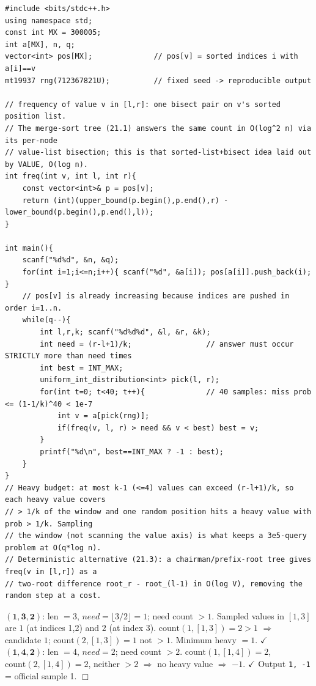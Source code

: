 \begin{lstlisting}[caption={CF 840D Summit: sample O(1) positions of the static window, count each candidate's frequency by a bisection on its sorted position list (the merge-sort-tree primitive of 21.1, transposed onto the value axis), keep the smallest heavy value over (r-l+1)/k}, label={lst:c19-summit}]
#include <bits/stdc++.h>
using namespace std;
const int MX = 300005;
int a[MX], n, q;
vector<int> pos[MX];              // pos[v] = sorted indices i with a[i]==v
mt19937 rng(712367821U);          // fixed seed -> reproducible output

// frequency of value v in [l,r]: one bisect pair on v's sorted position list.
// The merge-sort tree (21.1) answers the same count in O(log^2 n) via its per-node
// value-list bisection; this is that sorted-list+bisect idea laid out by VALUE, O(log n).
int freq(int v, int l, int r){
    const vector<int>& p = pos[v];
    return (int)(upper_bound(p.begin(),p.end(),r) - lower_bound(p.begin(),p.end(),l));
}

int main(){
    scanf("%d%d", &n, &q);
    for(int i=1;i<=n;i++){ scanf("%d", &a[i]); pos[a[i]].push_back(i); }
    // pos[v] is already increasing because indices are pushed in order i=1..n.
    while(q--){
        int l,r,k; scanf("%d%d%d", &l, &r, &k);
        int need = (r-l+1)/k;                 // answer must occur STRICTLY more than need times
        int best = INT_MAX;
        uniform_int_distribution<int> pick(l, r);
        for(int t=0; t<40; t++){              // 40 samples: miss prob <= (1-1/k)^40 < 1e-7
            int v = a[pick(rng)];
            if(freq(v, l, r) > need && v < best) best = v;
        }
        printf("%d\n", best==INT_MAX ? -1 : best);
    }
}
// Heavy budget: at most k-1 (<=4) values can exceed (r-l+1)/k, so each heavy value covers
// > 1/k of the window and one random position hits a heavy value with prob > 1/k. Sampling
// the window (not scanning the value axis) is what keeps a 3e5-query problem at O(q*log n).
// Deterministic alternative (21.3): a chairman/prefix-root tree gives freq(v in [l,r]) as a
// two-root difference root_r - root_(l-1) in O(log V), removing the random step at a cost.
\end{lstlisting}

\begin{tracebox}[Sample 1: array \(1\,1\,2\,2\); position lists \(pos(1)=\{1,2\}\), \(pos(2)=\{3,4\}\)]
\(\mathbf{(1,3,2)}\): len \(=3\), \(\mathit{need}=\lfloor 3/2\rfloor=1\); need count \(>1\).
Sampled values in \([1,3]\) are \(1\) (at indices 1,2) and \(2\) (at index 3).
\(\mathrm{count}(1,[1,3])=2>1\) \(\Rightarrow\) candidate \(1\);
\(\mathrm{count}(2,[1,3])=1\) not \(>1\). Minimum heavy \(=1\). \(\checkmark\)\\
\(\mathbf{(1,4,2)}\): len \(=4\), \(\mathit{need}=2\); need count \(>2\).
\(\mathrm{count}(1,[1,4])=2\), \(\mathrm{count}(2,[1,4])=2\), neither \(>2\) \(\Rightarrow\) no
heavy value \(\Rightarrow\) \(-1\). \(\checkmark\) Output \texttt{1, -1} = official sample 1. \(\Box\)
\end{tracebox}

